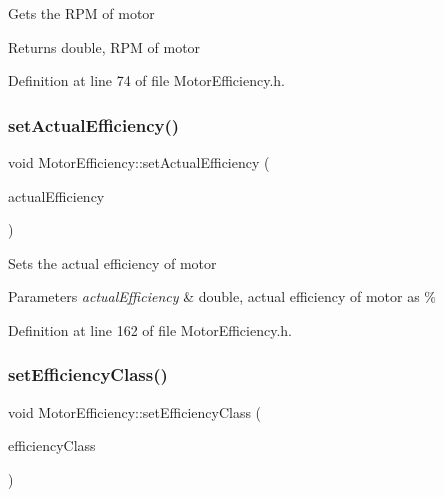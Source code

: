 Gets the R\+PM of motor \begin{DoxyReturn}{Returns}
double, R\+PM of motor 
\end{DoxyReturn}


Definition at line 74 of file Motor\+Efficiency.\+h.

\mbox{\label{class_motor_efficiency_a7a5ad8d01fdc0a3bf93d952752487496}} 
\subsubsection{\texorpdfstring{set\+Actual\+Efficiency()}{setActualEfficiency()}}
{\footnotesize\ttfamily void Motor\+Efficiency\+::set\+Actual\+Efficiency (\begin{DoxyParamCaption}\item[{double}]{actual\+Efficiency }\end{DoxyParamCaption})\hspace{0.3cm}{\ttfamily [inline]}}

Sets the actual efficiency of motor 
\begin{DoxyParams}{Parameters}
{\em actual\+Efficiency} & double, actual efficiency of motor as \% \\
\hline
\end{DoxyParams}


Definition at line 162 of file Motor\+Efficiency.\+h.

\mbox{\label{class_motor_efficiency_a1ff4790d01bf2e65bd7bce2edc98d0c5}} 
\subsubsection{\texorpdfstring{set\+Efficiency\+Class()}{setEfficiencyClass()}}
{\footnotesize\ttfamily void Motor\+Efficiency\+::set\+Efficiency\+Class (\begin{DoxyParamCaption}\item[{Motor\+::\+Efficiency\+Class}]{efficiency\+Class }\end{DoxyParamCaption})\hspace{0.3cm}{\ttfamily [inline]}}

